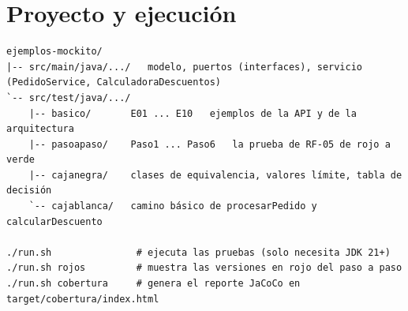 \documentclass[11pt,a4paper,oneside]{report}
\begin{document}
\appendix
\chapter{Proyecto y ejecución}
\label{anx:ejecucion}
\begin{lstlisting}[style=bash,caption={Estructura y comandos}]
ejemplos-mockito/
|-- src/main/java/.../   modelo, puertos (interfaces), servicio (PedidoService, CalculadoraDescuentos)
`-- src/test/java/.../
    |-- basico/       E01 ... E10   ejemplos de la API y de la arquitectura
    |-- pasoapaso/    Paso1 ... Paso6   la prueba de RF-05 de rojo a verde
    |-- cajanegra/    clases de equivalencia, valores límite, tabla de decisión
    `-- cajablanca/   camino básico de procesarPedido y calcularDescuento

./run.sh               # ejecuta las pruebas (solo necesita JDK 21+)
./run.sh rojos         # muestra las versiones en rojo del paso a paso
./run.sh cobertura     # genera el reporte JaCoCo en target/cobertura/index.html
\end{lstlisting}
\end{document}
